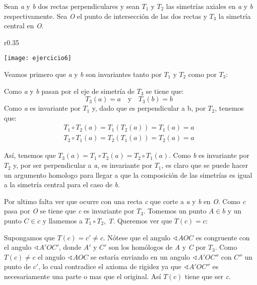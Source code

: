 \documentclass[12pt,a4paper]{article}
\begin{document}
 Sean \textit{a} y \textit{b} dos rectas perpendiculares y sean \(T_1\) y \(T_2\) las simetrías axiales en \textit{a} y \textit{b} respectivamente. Sea \textit{O} el punto de intersección de las dos rectas y \(T_3\) la simetría central en \textit{O}.
 
  \begin{wrapfigure}[9]{r}{0.35\textwidth}
 	\begin{center}
 		\texttt{[image: ejercicio6]}
 	\end{center}
 \end{wrapfigure}

Veamos primero que \textit{a} y \textit{b} son invariantes tanto por \(T_1\) y \(T_2\) como por \(T_3\):

Como \textit{a} y \textit{b} pasan por el eje de simetría de \(T_3\) se tiene que: 
\[T_3 (a) = a \quad \text{y} \quad T_3 (b) = b \]
Como \textit{a} es invariante por \(T_1\) y, dado que es perpendicular a b, por \(T_2\), tenemos que:
\begin{align*}
T_1 \circ T_2 (a) = T_1(T_2(a)) = T_1(a) = a \\ T_2 \circ T_1 (a) = T_2(T_1(a)) = T_2(a) = a
\end{align*}

\vspace{0.5em}

Así, tenemos que \( T_3 (a) = T_1 \circ T_2(a) = T_2 \circ T_1(a) \). Como \textit{b} es invariante por \(T_2\) y, por ser perpendicular a \textit{a}, es invariante por \(T_1\), es claro que se puede hacer un argumento homologo para llegar a que la composición de las simetrías es igual a la simetría central para el caso de \textit{b}.

Por ultimo falta ver que ocurre con una recta \textit{c} que corte a \textit{a} y \textit{b} en \textit{O}. Como \textit{c} pasa por \textit{O} se tiene que \textit{c} es invariante por \(T_3\). Tomemos un punto \( A \in b \) y un punto \( C \in c \) y llamemos a \(T_1 \circ T_2 \), \textit{T}. Queremos ver que \(T(c) = c\):

Supongamos que \(T(c) = c' \neq c \). Nótese que el angulo \( \sphericalangle AOC \) es congruente con el angulo \( \sphericalangle A'OC' \), donde \(A'\) y \(C'\) son los homólogos de \textit{A} y \textit{C} por \(T_3\). Como \(T(c) \neq c\) el angulo \( \sphericalangle AOC \) se estaría enviando en un angulo \( \sphericalangle A'OC'' \) con \(C''\) un punto de \(c'\), lo cual contradice el axioma de rigidez ya que \( \sphericalangle A'OC'' \) es necesariamente una parte o mas que el original. Así \(T(c)\) tiene que ser \textit{c}.
\end{document}
